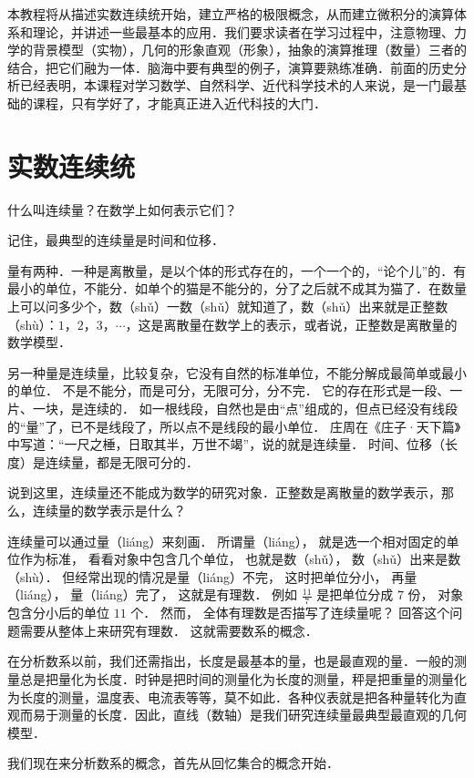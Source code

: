 本教程将从描述实数连续统开始，建立严格的极限概念，从而建立微积分的演算体系和理论，并讲述一些最基本的应用．我们要求读者在学习过程中，注意物理、力学的背景模型（实物），几何的形象直观（形象），抽象的演算推理（数量）三者的结合，把它们融为一体．脑海中要有典型的例子，演算要熟练准确．前面的历史分析已经表明，本课程对学习数学、自然科学、近代科学技术的人来说，是一门最基础的课程，只有学好了，才能真正进入近代科技的大门．

\section{实数连续统}

什么叫连续量？在数学上如何表示它们？

记住，最典型的连续量是时间和位移．

量有两种．一种是离散量，是以个体的形式存在的，一个一个的，``论个儿''的．有最小的单位，不能分．如单个的猫是不能分的，分了之后就不成其为猫了．在数量上可以问多少个，数（sh\v{u}）一数（sh\v{u}）就知道了，数（sh\v{u}）出来就是正整数（sh\`u）：$1$，$2$，$3$，$\cdots$，这是离散量在数学上的表示，或者说，正整数是离散量的数学模型．

另一种量是连续量，比较复杂，它没有自然的标准单位，不能分解成最简单或最小的单位． 不是不能分，而是可分，无限可分，分不完． 它的存在形式是一段、一片、一块，是连续的． 如一根线段，自然也是由``点''组成的，但点已经没有线段的``量''了，已不是线段了，所以点不是线段的最小单位． 庄周在《庄子·天下篇》中写道：``一尺之棰，日取其半，万世不竭''，说的就是连续量． 时间、位移（长度）是连续量，都是无限可分的．

说到这里，连续量还不能成为数学的研究对象．正整数是离散量的数学表示，那么，连续量的数学表示是什么？

连续量可以通过量（li\'ang）来刻画． 所谓量（li\'ang）， 就是选一个相对固定的单位作为标准， 看看对象中包含几个单位， 也就是数（sh\v{u}）， 数（sh\v{u}）出来是数（sh\`u）． 但经常出现的情况是量（li\'ang）不完， 这时把单位分小， 再量（li\'ang）， 量（li\'ang）完了， 这就是有理数． 例如 $\frac{11}{7}$ 是把单位分成 $7$ 份， 对象包含分小后的单位 $11$ 个． 然而， 全体有理数是否描写了连续量呢？ 回答这个问题需要从整体上来研究有理数． 这就需要数系的概念．

在分析数系以前，我们还需指出，长度是最基本的量，也是最直观的量．一般的测量总是把量化为长度．时钟是把时间的测量化为长度的测量，秤是把重量的测量化为长度的测量，温度表、电流表等等，莫不如此．各种仪表就是把各种量转化为直观而易于测量的长度．因此，直线（数轴）是我们研究连续量最典型最直观的几何模型．

我们现在来分析数系的概念，首先从回忆集合的概念开始．


